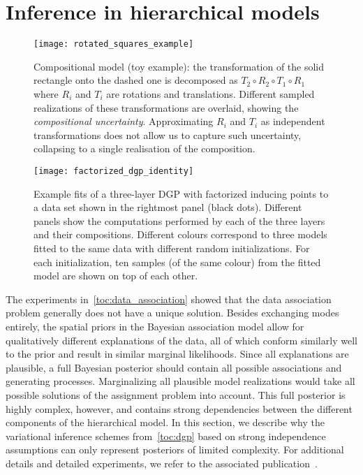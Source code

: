 \section{Inference in hierarchical models}
\label{toc:discussion:composition}
\begin{figure}[t]
    \centering
    \texttt{[image: rotated\_squares\_example]}
    \caption{
        \label{fig:composition:rotated_squares_example}
        Compositional model (toy example): the transformation of the solid rectangle onto the dashed one is decomposed as $T_2 \circ R_2 \circ T_1 \circ R_1$ where $R_i$ and $T_i$ are rotations and translations.
        Different sampled realizations of these transformations are overlaid, showing the \emph{compositional uncertainty}.
        Approximating $R_i$ and $T_i$ as independent transformations does not allow us to capture such uncertainty, collapsing to a single realisation of the composition.
    }
\end{figure}
\begin{figure}[t]
    \centering
    \texttt{[image: factorized\_dgp\_identity]}
    \caption{
        \label{fig:composition:identity_factorised}
        Example fits of a three-layer DGP with factorized inducing points to a data set shown in the rightmost panel (black dots).
        Different panels show the computations performed by each of the three layers and their compositions.
        Different colours correspond to three models fitted to the same data with different random initializations.
        For each initialization, ten samples (of the same colour) from the fitted model are shown on top of each other.
    }
\end{figure}
The experiments in~\cref{toc:data_association} showed that the data association problem generally does not have a unique solution.
Besides exchanging modes entirely, the spatial priors in the Bayesian association model allow for qualitatively different explanations of the data, all of which conform similarly well to the prior and result in similar marginal likelihoods.
Since all explanations are plausible, a full Bayesian posterior should contain all possible associations and generating processes.
Marginalizing all plausible model realizations would take all possible solutions of the assignment problem into account.
This full posterior is highly complex, however, and contains strong dependencies between the different components of the hierarchical model.
In this section, we describe why the variational inference schemes from~\cref{toc:dgp} based on strong independence assumptions can only represent posteriors of limited complexity.
For additional details and detailed experiments, we refer to the associated publication~\parencite{ustyuzhaninov_compositional_2020}.

